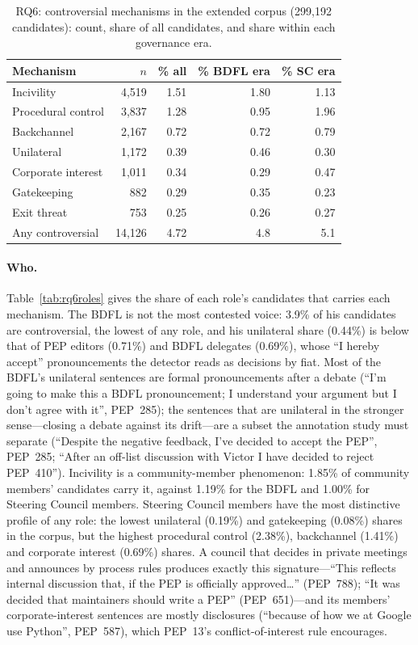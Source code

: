 \begin{table}[t]
\caption{RQ6: controversial mechanisms in the extended corpus (299,192 candidates): count, share of all candidates, and share within each governance era.}
\label{tab:rq6}
\small
\begin{tabular}{lrrrr}
\toprule
Mechanism & $n$ & \% all & \% BDFL era & \% SC era \\
\midrule
Incivility & 4,519 & 1.51 & 1.80 & 1.13 \\
Procedural control & 3,837 & 1.28 & 0.95 & 1.96 \\
Backchannel & 2,167 & 0.72 & 0.72 & 0.79 \\
Unilateral & 1,172 & 0.39 & 0.46 & 0.30 \\
Corporate interest & 1,011 & 0.34 & 0.29 & 0.47 \\
Gatekeeping & 882 & 0.29 & 0.35 & 0.23 \\
Exit threat & 753 & 0.25 & 0.26 & 0.27 \\
\midrule
Any controversial & 14,126 & 4.72 & 4.8 & 5.1 \\
\bottomrule
\end{tabular}
\end{table}

\paragraph{Who.} Table~\ref{tab:rq6roles} gives the share of each role's candidates that carries each mechanism. The BDFL is not the most contested voice: 3.9\% of his candidates are controversial, the lowest of any role, and his unilateral share (0.44\%) is below that of PEP editors (0.71\%) and BDFL delegates (0.69\%), whose ``I hereby accept'' pronouncements the detector reads as decisions by fiat. Most of the BDFL's unilateral sentences are formal pronouncements after a debate (``I'm going to make this a BDFL pronouncement; I understand your argument but I don't agree with it'', PEP~285); the sentences that are unilateral in the stronger sense---closing a debate against its drift---are a subset the annotation study must separate (``Despite the negative feedback, I've decided to accept the PEP'', PEP~285; ``After an off-list discussion with Victor I have decided to reject PEP~410''). Incivility is a community-member phenomenon: 1.85\% of community members' candidates carry it, against 1.19\% for the BDFL and 1.00\% for Steering Council members. Steering Council members have the most distinctive profile of any role: the lowest unilateral (0.19\%) and gatekeeping (0.08\%) shares in the corpus, but the highest procedural control (2.38\%), backchannel (1.41\%) and corporate interest (0.69\%) shares. A council that decides in private meetings and announces by process rules produces exactly this signature---``This reflects internal discussion that, if the PEP is officially approved\ldots'' (PEP~788); ``It was decided that maintainers should write a PEP'' (PEP~651)---and its members' corporate-interest sentences are mostly disclosures (``because of how we at Google use Python'', PEP~587), which PEP~13's conflict-of-interest rule encourages.

